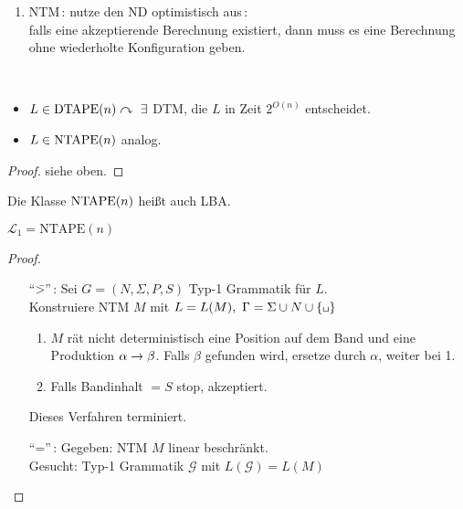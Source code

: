 {\begin{Bemerkung}
\begin{enumerate}
	falls sie akzeptiert, dann in weniger als $N$ Schritten,\\
	falls nach $N$ Schritten keine Terminierung erfolgt\\
	\quad$\curvearrowright$ Endlosschleife -- Abbruch
	\item \ac{NTM}\,: nutze den \ac{ND} optimistisch aus\,:\\
	falls eine akzeptierende Berechnung existiert, dann muss es eine Berechnung ohne wiederholte Konfiguration geben.
	\end{enumerate}
\end{Bemerkung}
\begin{Satz}[name={[$L\in\DTAPE(n),\ L\in\NTAPE(n)$]}]\label{satz:6.2}\
	\begin{itemize}
	\item $L\in\DTAPE(n) \curvearrowright\ \exists$ \ac{DTM}, die $L$ in Zeit $2^{O(n)}$ entscheidet.
	\item $L\in\operatorname{NTAPE}(n)$ analog.
	\end{itemize}
\end{Satz}\vspace{-2em}
\begin{proof}
	siehe oben.
\end{proof}
\begin{Bemerkung}
	Die Klasse $\operatorname{NTAPE} (n)$ heißt auch \ac{LBA}.
\end{Bemerkung}
%
\begin{Satz}\label{satz:6.3}
	$\mathcal L_1=\mathrm{NTAPE}(n)$
\end{Satz}
\begin{proof}\
\begin{itemize}
	\item["`\=>"'\,:] Sei $G=(N,\Sigma,P,S)$ Typ-1 Grammatik für $L$.\\
		Konstruiere \ac{NTM} $M$ mit $L=L(M),\ \Gamma = \Sigma\cup N\cup\{\blank\}$
		\begin{enumerate}
		\item $M$ rät nicht deterministisch eine Position auf
                  dem Band und eine Produktion $\alpha\-> \beta$. Falls $\beta$ gefunden wird, ersetze durch $\alpha$, weiter bei 1.
		\item Falls Bandinhalt $=S$ \quad stop, akzeptiert.
		\end{enumerate}
		Dieses Verfahren terminiert.
	\item["`\<="'\,:] %
	Gegeben: \ac{NTM} $M$ linear beschränkt.\\
	Gesucht: Typ-1 Grammatik $\mathcal{G}$ mit $L(\mathcal{G})=L(M)$\\

\end{itemize}
\end{proof}}
